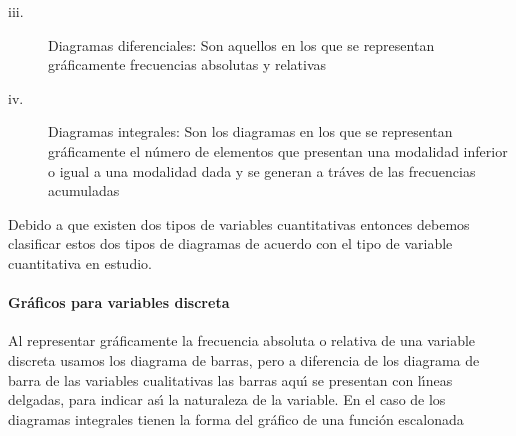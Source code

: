 \begin{description}
\item[iii.] Diagramas diferenciales: Son aquellos en los que se representan
gr\'{a}ficamente frecuencias absolutas y relativas

\item[iv.] Diagramas integrales: Son los diagramas en los que se representan
gr\'{a}ficamente el n\'{u}mero de elementos que presentan una modalidad
inferior o igual a una modalidad dada y se generan a tr\'{a}ves de las
frecuencias acumuladas
\end{description}

Debido a que existen dos tipos de variables cuantitativas entonces debemos
clasificar estos dos tipos de diagramas de acuerdo con el tipo de variable
cuantitativa en estudio.

\paragraph{Gr\'{a}ficos para variables discreta}

Al representar gr\'{a}ficamente la frecuencia absoluta o relativa de una
variable discreta usamos los diagrama de barras, pero a diferencia de los
diagrama de barra de las variables cualitativas las barras aqu\'{\i} se
presentan con l{\'\i}neas delgadas, para indicar as\'{\i} la naturaleza de la
variable. En el caso de los diagramas integrales tienen la forma del
gr\'{a}fico de una funci\'{o}n escalonada

